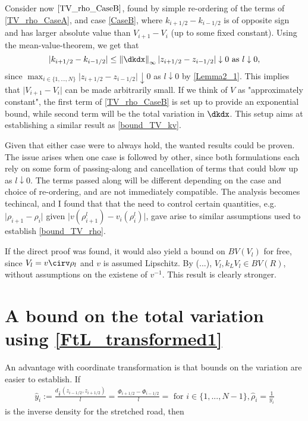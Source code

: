 Consider now $\eqref{TV_rho_CaseB}$, found by simple re-ordering of the terms of \eqref{TV_rho_CaseA}, and case \eqref{CaseB}, where $k_{i+1/2} - k_{i-1/2}$ is of opposite sign and has larger absolute value than $V_{i+1} - V_{i}$ (up to some fixed constant). Using the mean-value-theorem, we get that 
\begin{equation}
    \vert k_{i+1/2} - k_{i-1/2} \vert \leq \norm{\dkdx}_\infty \vert z_{i+1/2} - z_{i-1/2}\vert \downarrow 0 \text{ as } l\downarrow0,
\end{equation}
since $\max_{i \in \{1,...,N\}}\lvert z_{i+1/2} - z_{i-1/2} \vert \downarrow 0$ as $l \downarrow 0$ by \eqref{Lemma2_1}. This implies that $\vert V_{i+1} - V_{i}\vert $ can be made arbitrarily small. If we think of $V$ as "approximately constant", the first term of \eqref{TV_rho_CaseB} is set up to provide an exponential bound, while second term will be  the total variation in $\dkdx$. This setup aims at establishing a similar result as \eqref{bound_TV_kv}. 

Given that either case were to always hold, the wanted results could be proven. The issue arises when one case is followed by other, since both formulations each rely on some form of passing-along and cancellation of terms that could blow up as $l\downarrow 0$. The terms passed along will be different depending on the case and choice of re-ordering, and are not immediately compatible. The analysis becomes techincal, and I found that that the need to control certain quantities, e.g.  $\vert \rho_{i+1} - \rho_{i}\vert$ given $\vert v(\rho^l_{i+1}) - v_i(\rho^l_i) \vert$, gave arise to similar assumptions used to establish \eqref{bound_TV_rho}. 

If the direct proof was found, it would also yield a bound on $BV(V_l)$ for free, since $V_l = v \cirv \rho_l$ and $v$ is assumed Lipschitz. By (...), $V_l, k_L V_l \in BV(R)$, without assumptions on the existene of $v^{-1}$. This result is clearly stronger. 

\section{A bound on the total variation using \eqref{FtL_transformed1}}

An advantage with coordinate transformation \label{section:Phi} is that bounds on the variation are easier to establish. 
If 
\begin{align}
	\hat{y}_i := \frac{d_{\frac{1}{k}}(z_{i-1/2}, z_{i+1/2})}{l} = \frac{\Phi_{i+1/2} - \Phi_{i-1/2}}{l} =  \text{ for } i \in \{1,...,N-1\}, 
	\hat{\rho}_i = \frac{1}{y_i}
\end{align}
is the inverse density for the stretched road, then 
 
